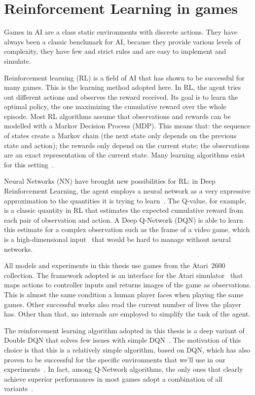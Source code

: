 \section{Reinforcement Learning in games}

Games in AI are a class static environments with discrete actions. They have
always been a classic benchmark for AI, because they provide various levels of
complexity, they have few and strict rules and are easy to implement and
simulate.

Reinforcement learning (RL) is a field of AI that has shown to be successful
for many games. %
This is the learning method adopted here. In RL, the agent tries out
different actions and observes the reward received.  Its goal is to learn the
optimal policy, the one maximizing the cumulative reward over the whole
episode.  Most RL algorithms assume that observations and rewards can be
modelled with a Markov Decision Process (MDP). This means that: the sequence
of states create a Markov chain (the next state only depends on the previous
state and action); the rewards only depend on the current state; the
observations are an exact representation of the current state. Many learning
algorithms exist for this setting~\cite{bib:rl-book}.

Neural Networks (NN) have brought new possibilities for RL: in Deep
Reinforcement Learning, the agent employs a neural network as a very
expressive approximation to the quantities it is trying to
learn~\cite{bib:deep-rl}.  The Q-value, for example, is a classic quantity in
RL that estimates the expected cumulative reward from each pair of observation
and action.  A Deep Q-Network (DQN) is able to learn this estimate for a
complex observation such as the frame of a video game, which is a
high-dimensional input~\cite{bib:atari-deeprl} that would be hard to manage
without neural networks.

All models and experiments in this thesis use games from the Atari~2600
collection. The framework adopted is an interface for the Atari
simulator~\cite{bib:atari-games} that maps actions to controller inputs and
returns images of the game as observations. This is almost the same
condition a human player faces when playing the same games. Other successful
works also read the current number of lives the player has. Other than that,
no internals are employed to simplify the task of the agent.

The reinforcement learning algorithm adopted in this thesis is a deep variant
of Double DQN that solves few issues with simple DQN~\cite{bib:double-q}.
The motivation of this choice is that this is a relatively simple algorithm,
based on DQN, which has also proven to be successful for the specific
environments that we'll use in our experiments~\cite{bib:atari-deepq-nature}.
In fact, among Q-Network algorithms, the only ones that clearly achieve
superior performances in most games adopt a combination of all
variants~\cite{bib:rainbow}.

